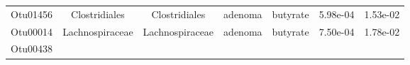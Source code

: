 \documentclass[11pt,]{article}
\begin{document}
\begin{longtable}[]{@{}ccccccc@{}}
\begin{minipage}[t]{0.09\columnwidth}\centering\strut
Otu01456\strut
\end{minipage} & \begin{minipage}[t]{0.17\columnwidth}\centering\strut
Clostridiales\strut
\end{minipage} & \begin{minipage}[t]{0.17\columnwidth}\centering\strut
Clostridiales\strut
\end{minipage} & \begin{minipage}[t]{0.09\columnwidth}\centering\strut
adenoma\strut
\end{minipage} & \begin{minipage}[t]{0.11\columnwidth}\centering\strut
butyrate\strut
\end{minipage} & \begin{minipage}[t]{0.09\columnwidth}\centering\strut
5.98e-04\strut
\end{minipage} & \begin{minipage}[t]{0.09\columnwidth}\centering\strut
1.53e-02\strut
\end{minipage}\tabularnewline
\begin{minipage}[t]{0.09\columnwidth}\centering\strut
Otu00014\strut
\end{minipage} & \begin{minipage}[t]{0.17\columnwidth}\centering\strut
Lachnospiraceae\strut
\end{minipage} & \begin{minipage}[t]{0.17\columnwidth}\centering\strut
Lachnospiraceae\strut
\end{minipage} & \begin{minipage}[t]{0.09\columnwidth}\centering\strut
adenoma\strut
\end{minipage} & \begin{minipage}[t]{0.11\columnwidth}\centering\strut
butyrate\strut
\end{minipage} & \begin{minipage}[t]{0.09\columnwidth}\centering\strut
7.50e-04\strut
\end{minipage} & \begin{minipage}[t]{0.09\columnwidth}\centering\strut
1.78e-02\strut
\end{minipage}\tabularnewline
\begin{minipage}[t]{0.09\columnwidth}\centering\strut
Otu00438\strut
\end{minipage} & \begin{minipage}[t]{0.17\columnwidth}\centering\strut

\end{minipage}
\end{longtable}
\end{document}
